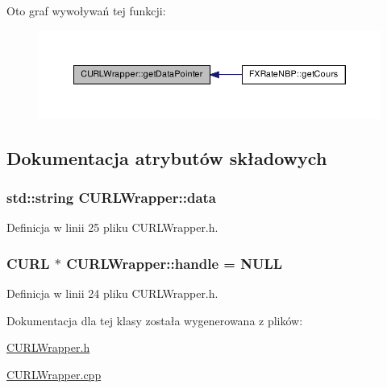 \-Oto graf wywoływań tej funkcji\-:\nopagebreak
\begin{figure}[H]
\begin{center}
\leavevmode
\includegraphics[width=350pt]{class_c_u_r_l_wrapper_af73bac595dd43910a0fc63206662f8bd_icgraph}
\end{center}
\end{figure}




\subsection{\-Dokumentacja atrybutów składowych}
\hypertarget{class_c_u_r_l_wrapper_ac67efd13ddfae37e5d7965c124a88120}{
\subsubsection[{data}]{\setlength{\rightskip}{0pt plus 5cm}std\-::string {\bf \-C\-U\-R\-L\-Wrapper\-::data}}}\label{class_c_u_r_l_wrapper_ac67efd13ddfae37e5d7965c124a88120}


\-Definicja w linii 25 pliku \-C\-U\-R\-L\-Wrapper.\-h.

\hypertarget{class_c_u_r_l_wrapper_a6e4ca915cbdfcca109fec4f46da430a2}{
\subsubsection[{handle}]{\setlength{\rightskip}{0pt plus 5cm}\-C\-U\-R\-L $\ast$ {\bf \-C\-U\-R\-L\-Wrapper\-::handle} = \-N\-U\-L\-L}}\label{class_c_u_r_l_wrapper_a6e4ca915cbdfcca109fec4f46da430a2}


\-Definicja w linii 24 pliku \-C\-U\-R\-L\-Wrapper.\-h.



\-Dokumentacja dla tej klasy została wygenerowana z plików\-:\begin{DoxyCompactItemize}
\item 
\hyperlink{_c_u_r_l_wrapper_8h}{\-C\-U\-R\-L\-Wrapper.\-h}\item 
\hyperlink{_c_u_r_l_wrapper_8cpp}{\-C\-U\-R\-L\-Wrapper.\-cpp}\end{DoxyCompactItemize}
